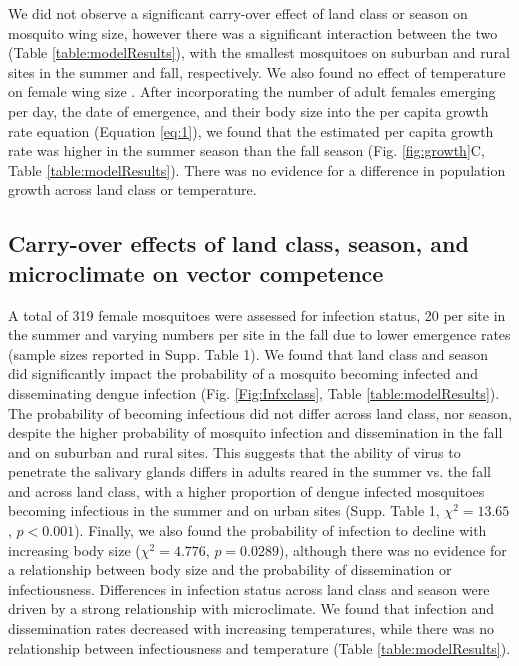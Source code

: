 \documentclass[12pt]{article}
\begin{document}
We did not observe a significant carry-over effect of land class or season on mosquito wing size, however there was a significant interaction between the two (Table \ref{table:modelResults}), with the smallest mosquitoes on suburban and rural sites in the summer and fall, respectively. We also found no effect of temperature on female wing size . After incorporating the number of adult females emerging per day, the date of emergence, and their body size into the per capita growth rate equation (Equation \ref{eq:1}), we found that the estimated per capita growth rate was higher in the summer season than the fall season (Fig. \ref{fig:growth}C, Table \ref{table:modelResults}). There was no evidence for a difference in population growth across land class or temperature.

\subsection{Carry-over effects of land class, season, and microclimate on vector competence}

A total of 319 female mosquitoes were assessed for infection status, 20 per site in the summer and varying numbers per site in the fall due to lower emergence rates (sample sizes reported in Supp. Table 1). We found that land class and season did significantly impact the probability of a mosquito becoming infected and disseminating dengue infection (Fig. \ref{Fig:Infxclass}, Table \ref{table:modelResults}). The probability of becoming infectious did not differ across land class, nor season, despite the higher probability of mosquito infection and dissemination in the fall and on suburban and rural sites. This suggests that the ability of virus to penetrate the salivary glands differs in adults reared in the summer vs. the fall and across land class, with a higher proportion of dengue infected mosquitoes becoming infectious in the summer and on urban sites (Supp. Table 1, $\chi^2=13.65$, $p<0.001$). Finally, we also found the probability of infection to decline with increasing body size ($\chi^2=4.776$, $p=0.0289$), although there was no evidence for a relationship between body size and the probability of dissemination or infectiousness. Differences in infection status across land class and season were driven by a strong relationship with microclimate. We found that infection and dissemination rates decreased with increasing temperatures, while there was no relationship between infectiousness and temperature (Table \ref{table:modelResults}).
\end{document}
